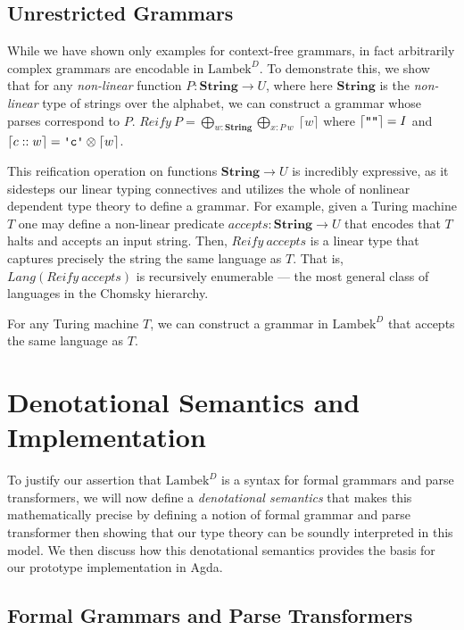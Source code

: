 \documentclass[acmsmall,nonacm]{acmart}
\newcommand{\StringSem}{\mathbf{String}}
\newcommand{\theoryabbv}{$\textrm{Lambek}^D$\xspace}
\newcommand{\literal}[1]{\texttt{\textquotesingle#1\textquotesingle}}
\newcommand{\stringquote}[1]{\texttt{\textquotedbl#1\textquotedbl}}
\newcommand{\LinSigTy}[3]{\textstyle\bigoplus_{#1 : #2} #3}
\newcommand{\agdalogo}{%
  \usebox{\logoagdabox}}%
\newcommand{\zenodolink}{https://zenodo.org/records/15049780}
\newcommand{\Agda}{\href{\zenodolink}{\agdalogo}}
\begin{document}
{\subsection{Unrestricted Grammars}

While we have shown only examples for context-free grammars, in fact
arbitrarily complex grammars are encodable in \theoryabbv. To
demonstrate this, we show that for any \emph{non-linear} function $P :
\StringSem \to U$, where here $\StringSem$ is the \emph{non-linear} type
of strings over the alphabet, we can construct a grammar whose parses
correspond to $P$.
\(
Reify~P = \LinSigTy{w} {\StringSem} {\LinSigTy {x} {P~w} {~\lceil w \rceil}}
\)
where $\lceil \stringquote{} \rceil = I$ and
$\lceil c :: w \rceil = \literal c \otimes \lceil w \rceil$.

This reification operation on functions $\StringSem \to U$ is incredibly expressive,
as it sidesteps our linear typing connectives and utilizes the whole of nonlinear
dependent type theory to define a grammar. For example, given a
Turing machine $T$ one may
define a non-linear predicate $accepts : \StringSem \to U$ that encodes that $T$
halts and accepts an input string. Then, $Reify~accepts$ is a linear type that
captures precisely the string the same language as $T$. That is,
$Lang(Reify~accepts)$ is recursively enumerable --- the most general class of
languages in the Chomsky hierarchy.
\begin{construction}[\Agda]
  \label{cons:turing}
  For any Turing machine $T$, we can construct a grammar in \theoryabbv
  that accepts the same language as $T$.
\end{construction}

\section{Denotational Semantics and Implementation}
\label{sec:semantics-and-metatheory}

To justify our assertion that \theoryabbv is a syntax for formal
grammars and parse transformers, we will now define a
\emph{denotational semantics} that makes this mathematically precise
by defining a notion of formal grammar and parse transformer then
showing that our type theory can be soundly interpreted in this
model. We then discuss how this denotational semantics provides the
basis for our prototype implementation in Agda.

\subsection{Formal Grammars and Parse Transformers}

}
\end{document}
